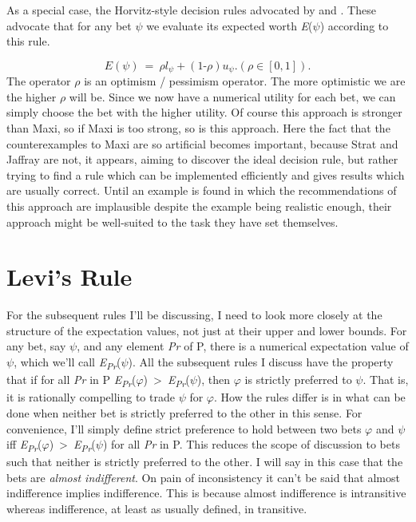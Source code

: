 As a special case, the Horvitz-style decision rules advocated by \citet{Strat1990} and \citet{Jaffray1994}. These advocate that for any
bet $\psi$ we evaluate its expected worth \emph{E}($\psi$) according to this rule.

\begin{equation}
E(\psi)~=~\rho l_\psi + (1‑ \rho)u_\psi. (\rho \in [0, 1]).
\end{equation}
The operator $\rho$ is an optimism / pessimism operator. The more optimistic
we are the higher $\rho$ will be. Since we now have a numerical utility for
each bet, we can simply choose the bet with the higher utility. Of
course this approach is stronger than Maxi, so if Maxi is too strong, so
is this approach. Here the fact that the counterexamples to Maxi are so
artificial becomes important, because Strat and Jaffray are not, it
appears, aiming to discover the ideal decision rule, but rather trying
to find a rule which can be implemented efficiently and gives results
which are usually correct. Until an example is found in which the
recommendations of this approach are implausible despite the example
being realistic enough, their approach might be well-suited to the task
they have set themselves.

\hypertarget{levis-rule}{%
\section{Levi's Rule}\label{levis-rule}}

For the subsequent rules I'll be discussing, I need to look more closely
at the structure of the expectation values, not just at their upper and
lower bounds. For any bet, say $\psi$, and any element \emph{Pr} of P, there
is a numerical expectation value of $\psi$, which we'll call
\emph{E\textsubscript{Pr}}($\psi$). All the subsequent rules I discuss have
the property that if for all \emph{Pr} in P
\emph{E\textsubscript{Pr}}($\varphi$)~\textgreater{}~\emph{E\textsubscript{Pr}}($\psi$),
then $\varphi$ is strictly preferred to $\psi$. That is, it is rationally compelling
to trade $\psi$ for $\varphi$. How the rules differ is in what can be done when
neither bet is strictly preferred to the other in this sense. For
convenience, I'll simply define strict preference to hold between two
bets $\varphi$ and $\psi$ iff
\emph{E\textsubscript{Pr}}($\varphi$)~\textgreater{}~\emph{E\textsubscript{Pr}}($\psi$)
for all \emph{Pr} in P. This reduces the scope of discussion to bets
such that neither is strictly preferred to the other. I will say in this
case that the bets are \emph{almost indifferent}. On pain of
inconsistency it can't be said that almost indifference implies
indifference. This is because almost indifference is intransitive
whereas indifference, at least as usually defined, in transitive.

